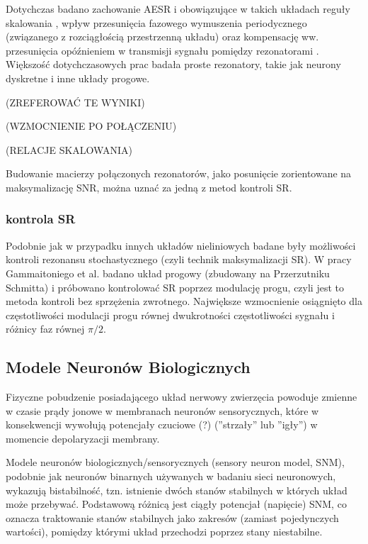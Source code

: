\documentclass[12pt]{article}
\begin{document}
  Dotychczas badano zachowanie AESR i obowiązujące w takich układach reguły skalowania \cite{lindner_meadows}, wpływ przesunięcia fazowego wymuszenia periodycznego (związanego z rozciągłością przestrzenną układu) \cite{ijmpb_14_8} oraz kompensację ww. przesunięcia opóźnieniem w transmisji sygnału pomiędzy rezonatorami \cite{ijmpb_23_2}. Większość dotychczasowych prac badała proste rezonatory, takie jak neurony dyskretne i inne układy progowe.

  (ZREFEROWAĆ TE WYNIKI)

  (WZMOCNIENIE PO POŁĄCZENIU)

  (RELACJE SKALOWANIA)

  Budowanie macierzy połączonych rezonatorów, jako posunięcie zorientowane na maksymalizację SNR, można uznać za jedną z metod kontroli SR.

  \subsubsection{kontrola SR}
  
  Podobnie jak w przypadku innych układów nieliniowych badane były możliwości kontroli rezonansu stochastycznego (czyli technik maksymalizacji SR). W pracy Gammaitoniego et al. \cite{gammaitoni} badano układ progowy (zbudowany na Przerzutniku Schmitta) i próbowano kontrolować SR poprzez modulację progu, czyli jest to metoda kontroli bez sprzężenia zwrotnego. Największe wzmocnienie osiągnięto dla częstotliwości modulacji progu równej dwukrotności częstotliwości sygnału i różnicy faz równej $\pi/2$.


  
  \subsection{Modele Neuronów Biologicznych}
  
  Fizyczne pobudzenie posiadającego układ nerwowy zwierzęcia powoduje zmienne w czasie prądy jonowe w membranach neuronów sensorycznych, które w konsekwencji wywołują potencjały czuciowe (?) (''strzały'' lub ''igły'') w momencie depolaryzacji membrany.
  
  Modele neuronów biologicznych/sensorycznych (sensory neuron model, SNM), podobnie jak neuronów binarnych używanych w badaniu sieci neuronowych, wykazują bistabilność, tzn. istnienie dwóch stanów stabilnych w których układ może przebywać. Podstawową różnicą jest ciągły potencjał (napięcie) SNM, co oznacza traktowanie stanów stabilnych jako zakresów (zamiast pojedynczych wartości), pomiędzy którymi układ przechodzi poprzez stany niestabilne. 
  
\end{document}
